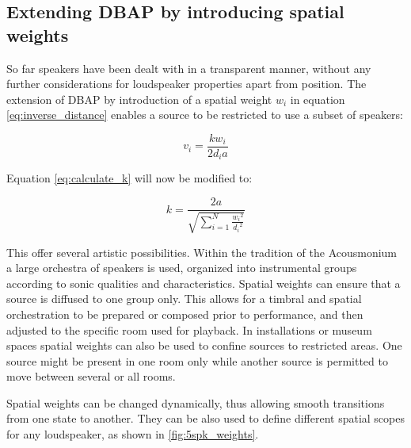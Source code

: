 \documentclass[twoside,10pt]{article}
\begin{document}
\subsection{Extending DBAP by introducing spatial weights}

So far speakers have been dealt with in a transparent manner, without any further considerations for loudspeaker properties apart from position. The extension of DBAP by introduction of a spatial weight $w_{i}$ in equation \ref{eq:inverse_distance} enables a source to be restricted to use a subset of speakers:

\begin{equation} \label{eq:inverse_distance_weighed}
v_{i} = \frac{k w_{i}}{2 d_{i} a} 
\end{equation}

Equation \ref{eq:calculate_k} will now be modified to:

\begin{equation} \label{eq:calculate_k_weighted}
k = \frac{2a}{\sqrt{\sum_{i=1}^{N} \frac{{w_{i}}^2}{{d_{i}}^2}}}
\end{equation}

This offer several artistic possibilities. Within the tradition of the Acousmonium \cite{Bayle:1993MusiqueAcousmatique} a large orchestra of speakers is used, organized into instrumental groups according to sonic qualities and characteristics\cite{Prager:2002acousmatique}. Spatial weights can ensure that a source is diffused to one group only. This allows for a timbral and spatial orchestration to be prepared or composed prior to performance, and then adjusted to the specific room used for playback.  In installations or museum spaces spatial weights can also be used to confine sources to restricted areas. One source might be present in one room only while another source is permitted to move between several or all rooms.

Spatial weights can be changed dynamically, thus allowing smooth transitions from one state to another. They can be also used to define different spatial scopes for any loudspeaker, as shown in \ref{fig:5spk_weights}.

\end{document}
